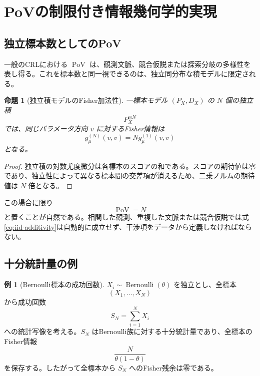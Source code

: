 \documentclass[a4paper,11pt]{ltjsarticle}
\theoremstyle{definition}
\newtheorem{example}[definition]{例}
\theoremstyle{plain}
\newtheorem{proposition}[definition]{命題}
\newcommand{\PoV}{\operatorname{PoV}}
\begin{document}
\section{PoVの制限付き情報幾何学的実現}

\subsection{独立標本数としてのPoV}

一般のCRLにおける $\PoV$ は、観測文脈、競合仮説または探索分岐の多様性を表し得る。これを標本数と同一視できるのは、独立同分布な積モデルに限定される。

\begin{proposition}[独立積モデルのFisher加法性]
一標本モデル $(P_X,D_X)$ の $N$ 個の独立積
\begin{equation}
 P_X^{\otimes N}
\end{equation}
では、同じパラメータ方向 $v$ に対するFisher情報は
\begin{equation}
 g_\mu^{(N)}(v,v)
 =N g_\mu^{(1)}(v,v)
 \label{eq:iid-additivity}
\end{equation}
となる。
\end{proposition}

\begin{proof}
独立積の対数尤度微分は各標本のスコアの和である。スコアの期待値は零であり、独立性によって異なる標本間の交差項が消えるため、二乗ノルムの期待値は $N$ 倍となる。
\end{proof}

この場合に限り
\begin{equation}
 \PoV=N
\end{equation}
と置くことが自然である。相関した観測、重複した文脈または競合仮説では式\eqref{eq:iid-additivity}は自動的に成立せず、干渉項をデータから定義しなければならない。

\subsection{十分統計量の例}

\begin{example}[Bernoulli標本の成功回数]
$X_i\sim\operatorname{Bernoulli}(\theta)$ を独立とし、全標本
\begin{equation}
 (X_1,\dots,X_N)
\end{equation}
から成功回数
\begin{equation}
 S_N=\sum_{i=1}^N X_i
\end{equation}
への統計写像を考える。$S_N$ はBernoulli族に対する十分統計量であり、全標本のFisher情報
\begin{equation}
 \frac{N}{\theta(1-\theta)}
\end{equation}
を保存する。したがって全標本から $S_N$ へのFisher残余は零である。
\end{example}
\end{document}
